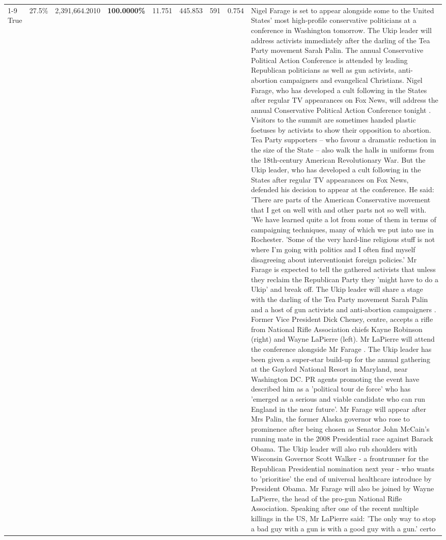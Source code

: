\begin{table}[H]
\begin{tabular}{lllrlllll}
\cline{1-9}
True & 27.5\% & 2,391,664.2010 & \bfseries \color{red} 100.0000\% & 11.751 & 445.853 & 591 & 0.754 & Nigel Farage is set to appear alongside some to the United States' most high-profile conservative politicians at a conference in Washington tomorrow. The Ukip leader will address activists immediately after the darling of the Tea Party movement Sarah Palin. The annual Conservative Political Action Conference is attended by leading Republican politicians as well as gun activists, anti-abortion campaigners and evangelical Christians. Nigel Farage, who has developed a cult following in the States after regular TV appearances on Fox News, will address the annual Conservative Political Action Conference tonight . Visitors to the summit are sometimes handed plastic foetuses by activists to show their opposition to abortion. Tea Party supporters – who favour a dramatic reduction in the size of the State – also walk the halls in uniforms from the 18th-century American Revolutionary War. But the Ukip leader, who has developed a cult following in the States after regular TV appearances on Fox News, defended his decision to appear at the conference. He said: 'There are parts of the American Conservative movement that I get on well with and other parts not so well with. 'We have learned quite a lot from some of them in terms of campaigning techniques, many of which we put into use in Rochester. 'Some of the very hard-line religious stuff is not where I'm going with politics and I often find myself disagreeing about interventionist foreign policies.' Mr Farage is expected to tell the gathered activists that unless they reclaim the Republican Party they 'might have to do a Ukip' and break off. The Ukip leader will share a stage with the darling of the Tea Party movement Sarah Palin and a host of gun activists and anti-abortion campaigners . Former Vice President Dick Cheney, centre, accepts a rifle from National Rifle Association chiefs Kayne Robinson (right) and Wayne LaPierre (left). Mr LaPierre will attend the conference alongside Mr Farage . The Ukip leader has been given a super-star build-up for the annual gathering at the Gaylord National Resort in Maryland, near Washington DC. PR agents promoting the event have described him as a 'political tour de force' who has 'emerged as a serious and viable candidate who can run England in the near future'. Mr Farage will appear after Mrs Palin, the former Alaska governor who rose to prominence after being chosen as Senator John McCain's running mate in the 2008 Presidential race against Barack Obama. The Ukip leader will also rub shoulders with Wisconsin Governor Scott Walker - a frontrunner for the Republican Presidential nomination next year - who wants to 'prioritise' the end of universal healthcare introduce by President Obama. Mr Farage will also be joined by Wayne LaPierre, the head of the pro-gun National Rifle Association. Speaking after one of the recent multiple killings in the US, Mr LaPierre said: 'The only way to stop a bad guy with a gun is with a good guy with a gun.' certo \\

\end{tabular}
\end{table}
